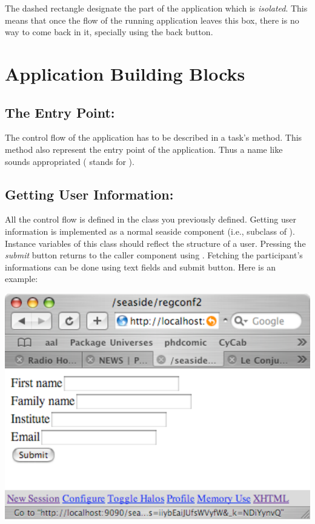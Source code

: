 The dashed rectangle designate the part of the application which is \textit{isolated}. This means that once the flow of the running application leaves this box, there is no way to come back in it, specially using the back button.


\section{Application Building Blocks}

\subsection{The Entry Point: }
The control flow of the application has to be described in a task's  method. This method also represent the entry point of the application. Thus a name like  sounds appropriated ( stands for \regconf). 





\subsection{Getting User Information: }

All the control flow is defined in the class you previously defined. Getting user information is implemented as a normal seaside component (i.e., subclass of ). Instance variables of this class should reflect the structure of a user. Pressing the \textit{submit} button returns to the caller component using . Fetching the participant's informations can be done using text fields and submit button. Here is an example:

\includegraphics[scale=0.7]{userinfo}

